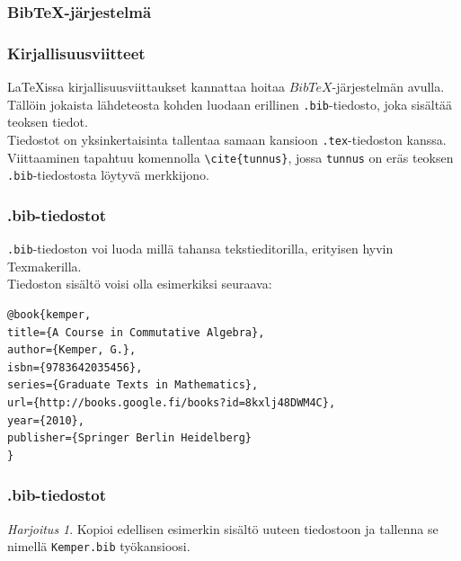 \documentclass[handout]{beamer}
\theoremstyle{remark}
\newtheorem{harj}{Harjoitus}[section]
\newcommand{\vaihto}{\\ \vspace{10pt}}
\newcommand{\BibTeX}{BibTeX}
\begin{document}
\subsubsection{BibTeX-järjestelmä}
\begin{frame}[fragile]
\frametitle{Kirjallisuusviitteet}
\LaTeX issa kirjallisuusviittaukset kannattaa hoitaa \(\BibTeX\)-järjestelmän avulla. 
\vaihto
Tällöin jokaista lähdeteosta kohden luodaan erillinen \verb-.bib--tiedosto, joka sisältää teoksen tiedot. 
\vaihto
Tiedostot on yksinkertaisinta tallentaa samaan kansioon \verb-.tex--tiedoston kanssa.
\vaihto
Viittaaminen tapahtuu komennolla \verb-\cite{tunnus}-, jossa \verb-tunnus- on eräs teoksen \verb-.bib--tiedostosta löytyvä merkkijono.
%
%
\end{frame}
\begin{frame}[fragile]
\frametitle{.bib-tiedostot}
\verb-.bib--tiedoston voi luoda millä tahansa tekstieditorilla, erityisen hyvin Texmakerilla. 
\vaihto
Tiedoston sisältö voisi olla esimerkiksi seuraava:\vaihto
\begin{scriptsize}
\begin{Verbatim}[frame=single]
@book{kemper,
title={A Course in Commutative Algebra},
author={Kemper, G.},
isbn={9783642035456},
series={Graduate Texts in Mathematics},
url={http://books.google.fi/books?id=8kxlj48DWM4C},
year={2010},
publisher={Springer Berlin Heidelberg}
}
\end{Verbatim}
\end{scriptsize}
\end{frame}
\begin{frame}[fragile]
\frametitle{.bib-tiedostot}
\begin{harj}
Kopioi edellisen esimerkin sisältö uuteen tiedostoon ja tallenna se nimellä \verb-Kemper.bib- työkansioosi. 
\end{harj}
\end{frame}
\end{document}
